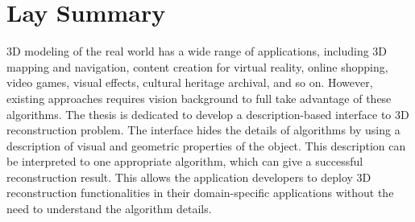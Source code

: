
\chapter{Lay Summary}

3D modeling of the real world has a wide range of applications, including 3D mapping and navigation, content creation for virtual reality, online shopping, video games, visual effects, cultural heritage archival, and so on. However, existing approaches requires vision background to full take advantage of these algorithms. The thesis is dedicated to develop a description-based interface to 3D reconstruction problem. The interface hides the details of algorithms by using a description of visual and geometric properties of the object. This description can be interpreted to one appropriate algorithm, which can give a successful reconstruction result. This allows the application developers to deploy 3D reconstruction functionalities in their domain-specific applications without the need to understand the algorithm details.